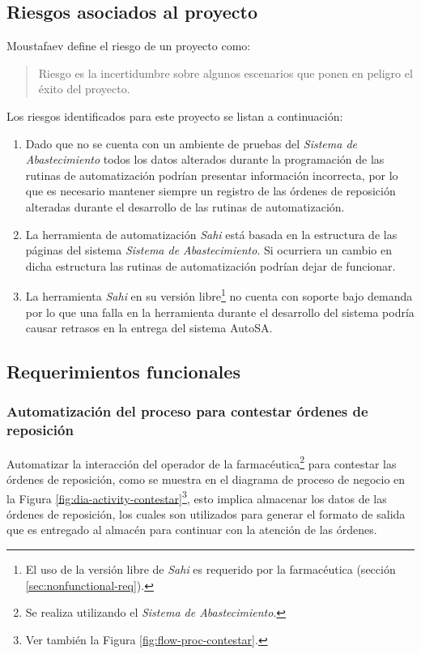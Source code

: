 \subsection{Riesgos asociados al proyecto}\label{sec:riesgos}
Moustafaev\cite{ScopeManagement} define el riesgo de un proyecto como:
\begin{quote}
Riesgo es la incertidumbre sobre algunos escenarios que ponen en peligro el éxito del proyecto.
\end{quote}
Los riesgos identificados para este proyecto se listan a continuación:
\begin{enumerate}
  \item Dado que no se cuenta con un ambiente de pruebas del \textit{Sistema de Abastecimiento} todos los datos alterados durante la programación de las rutinas de automatización podrían presentar información incorrecta, por lo que es necesario mantener siempre un registro de las órdenes de reposición alteradas durante el desarrollo de las rutinas de automatización.
  \item La herramienta de automatización \textit{Sahi} está basada en la estructura de las páginas del sistema \textit{Sistema de Abastecimiento}. Si ocurriera un cambio en dicha estructura las rutinas de automatización podrían dejar de funcionar.
  \item La herramienta \textit{Sahi} en su versión libre\footnote{El uso de la versión libre de \textit{Sahi} es requerido por la farmacéutica (sección \ref{sec:nonfunctional-req}).} no cuenta con soporte bajo demanda por lo que una falla en la herramienta durante el desarrollo del sistema podría causar retrasos en la entrega del sistema AutoSA.
\end{enumerate}


\subsection{Requerimientos funcionales}\label{sec:req-fun}
\subsubsection{Automatización del proceso para contestar órdenes de reposición}\label{sec:req-contestar}
Automatizar la interacción del operador de la farmacéutica\footnote{Se realiza utilizando el \textit{Sistema de Abastecimiento}.} para contestar las órdenes de reposición, como se muestra en el diagrama de proceso de negocio en la Figura \ref{fig:dia-activity-contestar}\footnote{Ver también la Figura \ref{fig:flow-proc-contestar}.}, esto implica almacenar los datos de las órdenes de reposición, los cuales son utilizados para generar el formato de salida que es entregado al almacén para continuar con la atención de las órdenes.

